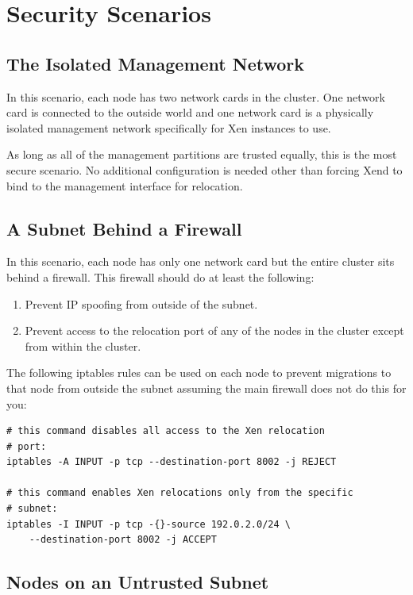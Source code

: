 \documentclass[11pt,twoside,final,openright]{report}
\begin{document}
\section{Security Scenarios}


\subsection{The Isolated Management Network}

In this scenario, each node has two network cards in the cluster. One
network card is connected to the outside world and one network card is a
physically isolated management network specifically for Xen instances to
use.

As long as all of the management partitions are trusted equally, this is
the most secure scenario. No additional configuration is needed other
than forcing Xend to bind to the management interface for relocation.


\subsection{A Subnet Behind a Firewall}

In this scenario, each node has only one network card but the entire
cluster sits behind a firewall. This firewall should do at least the
following:

\begin{enumerate}
\item Prevent IP spoofing from outside of the subnet.
\item Prevent access to the relocation port of any of the nodes in the
  cluster except from within the cluster.
\end{enumerate}

The following iptables rules can be used on each node to prevent
migrations to that node from outside the subnet assuming the main
firewall does not do this for you:

\begin{verbatim}
# this command disables all access to the Xen relocation
# port:
iptables -A INPUT -p tcp --destination-port 8002 -j REJECT

# this command enables Xen relocations only from the specific
# subnet:
iptables -I INPUT -p tcp -{}-source 192.0.2.0/24 \
    --destination-port 8002 -j ACCEPT
\end{verbatim}

\subsection{Nodes on an Untrusted Subnet}
\end{document}

